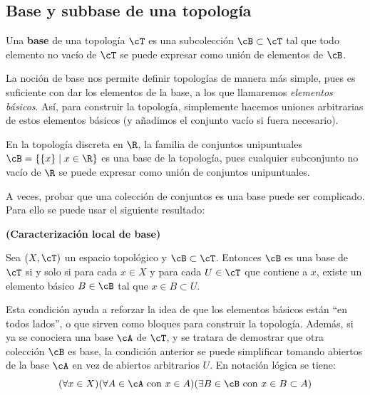 \subsection*{Base y subbase de una topología}

\begin{deff}
    Una {\bf base} de una topología $\cT$ es una subcolección $\cB \subset \cT$ tal que todo elemento no vacío de $\cT$ se puede expresar como unión de elementos de $\cB$.
\end{deff}

La noción de base nos permite definir topologías de manera más simple, pues es suficiente con dar los elementos de la base, a los que llamaremos \textit{elementos básicos}. Así, para construir la topología, simplemente hacemos uniones arbitrarias de estos elementos básicos (y añadimos el conjunto vacío si fuera necesario).

\begin{ej}
En la topología discreta en $\R$, la familia de conjuntos unipuntuales $\cB = \{\{x\} \mid x\in \R\}$ es una base de la topología, pues cualquier subconjunto no vacío de $\R$ se puede expresar como unión de conjuntos unipuntuales.
\end{ej}

A veces, probar que una colección de conjuntos es una base puede ser complicado. Para ello se puede usar el siguiente resultado:

\begin{prop}
    {\bf (Caracterización local de base)}
    \item Sea $(X,\cT)$ un espacio topológico y $\cB\subset\cT$. Entonces $\cB$ es una base de $\cT$ si y solo si para cada $x \in X$ y para cada $U \in \cT$ que contiene a $x$, existe un elemento básico $B\in \cB$ tal que $x \in B \subset U$.
\end{prop}

 Esta condición ayuda a reforzar la idea de que los elementos básicos están ``en todos lados'', o que sirven como bloques para construir la topología. Además, si ya se conociera una base $\cA$ de $\cT$, y se tratara de demostrar que otra colección $\cB$ es base, la condición anterior se puede simplificar tomando abiertos de la base $\cA$ en vez de abiertos arbitrarios $U$. En notación lógica se tiene:
    \[(\forall x \in X) (\forall A \in \cA \text{ con } x \in A) (\exists B\in \cB \text{ con } x \in B \subset A)\]
     
